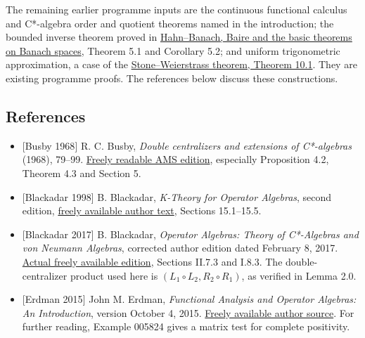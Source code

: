 \documentclass[
  11pt,
]{article}
\begin{document}
The remaining earlier programme inputs are the continuous functional
calculus and C*-algebra order and quotient theorems named in the
introduction; the bounded inverse theorem proved in
\href{https://kokunoyumeto.github.io/open-math-courses/courses/foundations-of-von-neumann-algebras/hahn-banach-baire-and-the-basic-theorems-on-banach-spaces.html}{Hahn--Banach,
Baire and the basic theorems on Banach spaces}, Theorem 5.1 and
Corollary 5.2; and uniform trigonometric approximation, a case of the
\href{https://kokunoyumeto.github.io/open-math-courses/courses/function-algebras-and-approximation/the-stone-weierstrass-theorem-for-functions-vanishing-at-infinity.html}{Stone--Weierstrass
theorem, Theorem 10.1}. They are existing programme proofs. The
references below discuss these constructions.

\subsection{References}\label{references}

\begin{itemize}
\item
  {[}Busby 1968{]} R. C. Busby, \emph{Double centralizers and extensions
  of C*-algebras} (1968), 79--99.
  \href{https://www.ams.org/journals/tran/1968-132-01/S0002-9947-1968-0225175-5/}{Freely
  readable AMS edition}, especially Proposition 4.2, Theorem 4.3 and
  Section 5.
\item
  {[}Blackadar 1998{]} B. Blackadar, \emph{K-Theory for Operator
  Algebras}, second edition,
  \href{https://www.bruceblackadar.com/Mathematics/book6.pdf}{freely
  available author text}, Sections 15.1--15.5.
\item
  {[}Blackadar 2017{]} B. Blackadar, \emph{Operator Algebras: Theory of
  C*-Algebras and von Neumann Algebras}, corrected author edition dated
  February 8, 2017.
  \href{https://www.bruceblackadar.com/Mathematics/Cycr.pdf}{Actual
  freely available edition}, Sections II.7.3 and I.8.3. The
  double-centralizer product used here is
  \((L_1\circ L_2,R_2\circ R_1)\), as verified in Lemma 2.0.
\item
  {[}Erdman 2015{]} John M. Erdman, \emph{Functional Analysis and
  Operator Algebras: An Introduction}, version October 4, 2015.
  \href{https://web.pdx.edu/~erdman/FAOA/functional_analysis_operator_algebras_web.zip}{Freely
  available author source}. For further reading, Example 005824 gives a
  matrix test for complete positivity.
\end{itemize}
\end{document}
